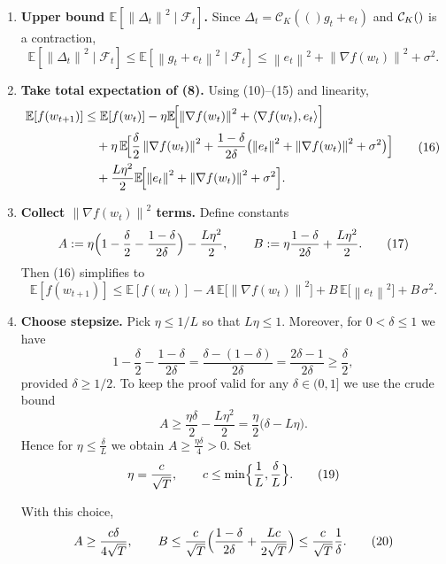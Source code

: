 \documentclass[11pt]{article}
\newcommand{\E}{\mathbb{E}}
\newcommand{\norm}[1]{\left\|#1\right\|}
\newcommand{\inner}[2]{\langle #1,#2\rangle}
\newcommand{\cK}[1]{\mathcal{C}_K(#1)}   %
\newcommand{\grad}{\nabla}
\begin{document}
\begin{enumerate}
\item[Step 8.] \textbf{Upper bound $\E[\norm{\Delta_t}^{2}\mid\mathcal{F}_t]$.}
Since $\Delta_t=\cK(g_t+e_t)$ and $\cK$ is a contraction,
\[
\E\!\left[\norm{\Delta_t}^{2}\mid\mathcal{F}_t\right]
 \le \E\!\left[\norm{g_t+e_t}^{2}\mid\mathcal{F}_t\right]
 \le \norm{e_t}^{2}+ \norm{\grad f(w_t)}^{2}+ \sigma^{2}.
\tag{15}
\]

\item[Step 9.] \textbf{Take total expectation of (8).}
Using (10)–(15) and linearity,
\[
\begin{aligned}
\E[f(w_{t+1})] &\le \E[f(w_t)] 
   -\eta \E\!\Bigl[\norm{\grad f(w_t)}^{2}+\inner{\grad f(w_t)}{e_t}\Bigr] \\
   &\quad +\eta\,\E\!\Bigl[\frac{\delta}{2}\norm{\grad f(w_t)}^{2}
        +\frac{1-\delta}{2\delta}\bigl(\norm{e_t}^{2}+ \norm{\grad f(w_t)}^{2}+ \sigma^{2}\bigr)\Bigr] \\
   &\quad +\frac{L\eta^{2}}{2}\E\!\Bigl[\norm{e_t}^{2}+ \norm{\grad f(w_t)}^{2}+ \sigma^{2}\Bigr].
\end{aligned}
\tag{16}
\]

\item[Step 10.] \textbf{Collect $\norm{\grad f(w_t)}^{2}$ terms.}
Define constants
\[
A:=\eta\Bigl(1-\frac{\delta}{2}-\frac{1-\delta}{2\delta}\Bigr)-\frac{L\eta^{2}}{2},
\qquad
B:=\eta\frac{1-\delta}{2\delta}+\frac{L\eta^{2}}{2}.
\tag{17}
\]
Then (16) simplifies to
\[
\E[f(w_{t+1})]\le \E[f(w_t)] - A\,\E\!\bigl[\norm{\grad f(w_t)}^{2}\bigr]
                 + B\,\E\!\bigl[\norm{e_t}^{2}\bigr] + B\,\sigma^{2}.
\tag{18}
\]

\item[Step 11.] \textbf{Choose stepsize.}
Pick $\eta\le 1/L$ so that $L\eta\le1$. Moreover, for $0<\delta\le1$ we have
\[
1-\frac{\delta}{2}-\frac{1-\delta}{2\delta}
= \frac{\delta- (1-\delta)}{2\delta}
= \frac{2\delta-1}{2\delta}\ge \frac{\delta}{2},
\]
provided $\delta\ge 1/2$. To keep the proof valid for any $\delta\in(0,1]$ we use the crude bound
\[
A\ge \frac{\eta\delta}{2}-\frac{L\eta^{2}}{2}
   = \frac{\eta}{2}\bigl(\delta-L\eta\bigr).
\]
Hence for $\eta\le \frac{\delta}{L}$ we obtain $A\ge \frac{\eta\delta}{4}>0$.
Set
\[
\eta = \frac{c}{\sqrt{T}},\qquad c\le \min\Bigl\{\frac{1}{L},\frac{\delta}{L}\Bigr\}.
\tag{19}
\]

With this choice,
\[
A\ge \frac{c\delta}{4\sqrt{T}},\qquad 
B\le \frac{c}{\sqrt{T}}\Bigl(\frac{1-\delta}{2\delta}+\frac{L c}{2\sqrt{T}}\Bigr)
      \le \frac{c}{\sqrt{T}}\frac{1}{\delta}.
\tag{20}
\]


\end{enumerate}
\end{document}

